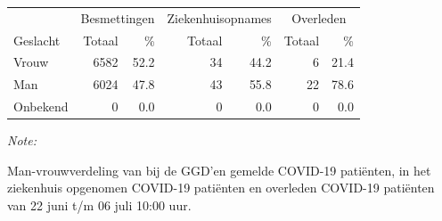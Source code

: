 \documentclass[
  english,
  man,floatsintext]{apa6}
\begin{document}
\begin{table}
\centering\begingroup\fontsize{11}{13}\selectfont

\begin{threeparttable}
\begin{tabular}{lrrrrrr}
\toprule
\multicolumn{1}{c}{ } & \multicolumn{2}{c}{Besmettingen} & \multicolumn{2}{c}{Ziekenhuisopnames} & \multicolumn{2}{c}{Overleden} \\
\cmidrule(l{3pt}r{3pt}){2-3} \cmidrule(l{3pt}r{3pt}){4-5} \cmidrule(l{3pt}r{3pt}){6-7}
Geslacht & Totaal & \% & Totaal & \% & Totaal & \%\\
\midrule
Vrouw & 6582 & 52.2 & 34 & 44.2 & 6 & 21.4\\
Man & 6024 & 47.8 & 43 & 55.8 & 22 & 78.6\\
Onbekend & 0 & 0.0 & 0 & 0.0 & 0 & 0.0\\
\bottomrule
\end{tabular}
\begin{tablenotes}
\item \textit{Note: } 
\item Man-vrouwverdeling van bij de GGD’en gemelde COVID-19 patiënten, in het ziekenhuis opgenomen COVID-19 patiënten en overleden COVID-19 patiënten van 22 juni t/m 06 juli 10:00 uur.
\end{tablenotes}
\end{threeparttable}
\endgroup{}
\end{table}
\newpage
\end{document}
